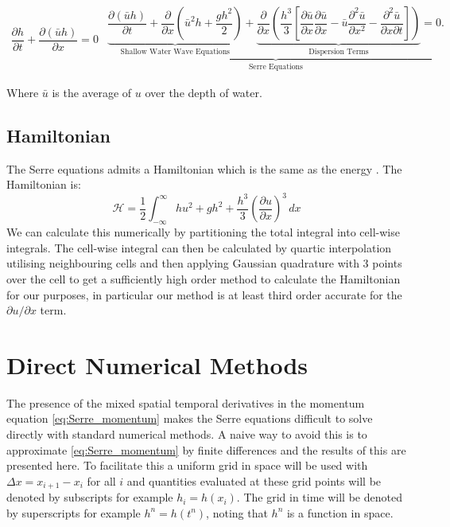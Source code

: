 \documentclass[SingleSpace,12pt,Proceedings]{Serre_ASCE}
\begin{document}
\begin{linenomath*}
\begin{subequations}\label{eq:Serre_nonconservative_form}
\begin{gather}
\dfrac{\partial h}{\partial t} + \dfrac{\partial (\bar{u}h)}{\partial x} = 0
\label{eq:Serre_continuity}
\end{gather}
\begin{gather}
\underbrace{\underbrace{\dfrac{\partial (\bar{u}h)}{\partial t} + \dfrac{\partial}{\partial x} \left ( \bar{u}^2h + \dfrac{gh^2}{2}\right )}_{\text{Shallow Water Wave Equations}} + \underbrace{\dfrac{\partial}{\partial x} \left (  \dfrac{h^3}{3} \left [ \dfrac{\partial \bar{u} }{\partial x} \dfrac{\partial \bar{u}}{\partial x} - \bar{u} \dfrac{\partial^2 \bar{u}}{\partial x^2}  - \dfrac{\partial^2 \bar{u}}{\partial x \partial t}\right ] \right )}_{\text{Dispersion Terms}} = 0.}_{\text{Serre Equations}}
\label{eq:Serre_momentum}
\end{gather}
\end{subequations}
\end{linenomath*}
Where $\bar{u}$ is the average of $u$ over the depth of water. 

\subsection{Hamiltonian}

The Serre equations admits a Hamiltonian which is the same as the energy \cite{Li-Y-2002,Hank-etal-2010-2034}. The Hamiltonian is:
\begin{equation}
\label{eqn:Hamildef}
\mathcal{H} = \frac{1}{2}\int_{-\infty}^{\infty} hu^2 + gh^2 + \frac{h^3}{3} \left(\frac{\partial u}{\partial x}\right)^3\, dx
\end{equation}
We can calculate this numerically by partitioning the total integral into cell-wise integrals. The cell-wise integral can then be calculated by quartic interpolation utilising neighbouring cells and then applying Gaussian quadrature with 3 points over the cell to get a sufficiently high order method to calculate the Hamiltonian for our purposes, in particular our method is at least third order accurate for the $\partial u / \partial x$ term. 
\section{Direct Numerical Methods} 
\label{sec:DirNumMet}
The presence of the mixed spatial temporal derivatives in the momentum equation \eqref{eq:Serre_momentum} makes the Serre equations difficult to solve directly with standard numerical methods. A naive way to avoid this is to approximate \eqref{eq:Serre_momentum} by finite differences and the results of this are presented here. To facilitate this a uniform grid in space will be used with $\Delta x  = x_{i+1} - x_i$ for all $i$ and quantities evaluated at these grid points will be denoted by subscripts for example $h_i = h(x_i)$. The grid in time will be denoted by superscripts for example $h^n = h(t^n)$, noting that $h^n$ is a function in space. 
\end{document}
